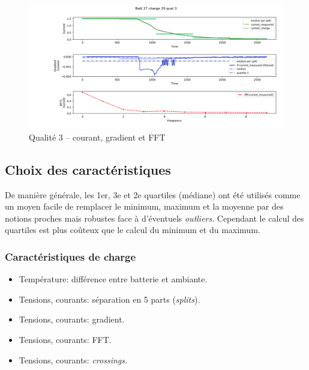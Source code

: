 \begin{figure}['h!']
    \includegraphics[scale=0.47]{images/rf/batt27_charge20_qual3.png}
    \caption{Qualité 3 -- courant, gradient et FFT}
    \label{fig:RFquality}
\end{figure}

\clearpage

\subsection{Choix des caractéristiques}

De manière générale, les 1er, 3e et 2e quartiles (médiane) ont été utilisés comme un moyen facile de remplacer le minimum, maximum et la moyenne par des notions proches mais robustes face à d'éventuels \textit{outliers}. Cependant le calcul des quartiles est plus coûteux que le calcul du minimum et du maximum.

\subsubsection{Caractéristiques de charge}

\begin{itemize}
    \item Température: différence entre batterie et ambiante.
    \item Tensions, courants: séparation en 5 parts (\textit{splits}).
    \item Tensions, courants: gradient.
    \item Tensions, courants: FFT.
    \item Tensions, courants: \textit{crossings}.
\end{itemize}

